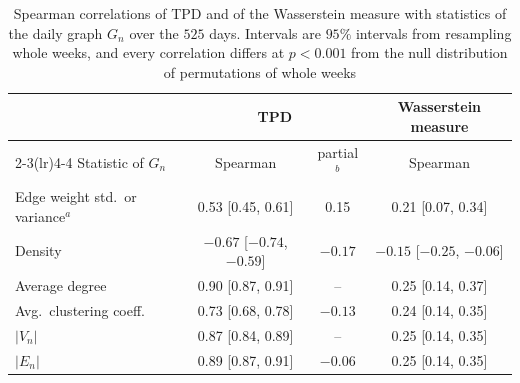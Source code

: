 \begin{table}[!ht]
\centering
\caption{Spearman correlations of TPD and of the Wasserstein measure with statistics of the daily graph $G_{n}$ over the $525$ days.
Intervals are $95\%$ intervals from resampling whole weeks, and every correlation differs at $p<0.001$ from the null distribution of permutations of whole weeks}
\label{tab:comparison_corr}
\small
\begin{tabular}{@{}lccc@{}}
\toprule
 & \multicolumn{2}{c}{TPD} & Wasserstein measure\\
\cmidrule(lr){2-3}\cmidrule(lr){4-4}
Statistic of $G_n$ & Spearman & partial$^{b}$ & Spearman\\
\midrule
Edge weight std.\ or variance$^{a}$ & 0.53 [0.45, 0.61] & 0.15 & 0.21 [0.07, 0.34]\\
Density & $-0.67$ [$-0.74$, $-0.59$] & $-0.17$ & $-0.15$ [$-0.25$, $-0.06$]\\
Average degree & 0.90 [0.87, 0.91] & -- & 0.25 [0.14, 0.37]\\
Avg.\ clustering coeff. & 0.73 [0.68, 0.78] & $-0.13$ & 0.24 [0.14, 0.35]\\
$|V_n|$ & 0.87 [0.84, 0.89] & -- & 0.25 [0.14, 0.35]\\
$|E_n|$ & 0.89 [0.87, 0.91] & $-0.06$ & 0.25 [0.14, 0.35]\\
\bottomrule
\end{tabular}
\end{table}
